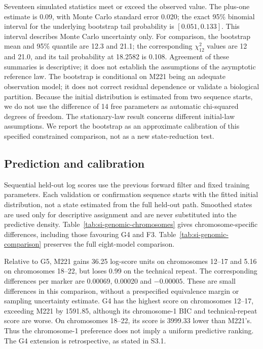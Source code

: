\documentclass[11pt]{article}
\begin{document}
Seventeen simulated statistics meet or exceed the observed value. The
plus-one estimate is 0.09, with Monte Carlo standard error 0.020; the exact
95\% binomial interval for the underlying bootstrap tail probability is
$[0.051,0.133]$. This interval describes Monte Carlo uncertainty only.
For comparison, the bootstrap mean and 95\% quantile are 12.3 and 21.1;
the corresponding $\chi^2_{12}$ values are 12 and 21.0, and its tail
probability at 18.2582 is 0.108. Agreement of these summaries is descriptive;
it does not establish the assumptions of the asymptotic reference law.
The bootstrap is conditional on M221 being an adequate observation model;
it does not correct residual dependence or validate a biological partition.
Because the initial distribution is estimated from two sequence starts,
we do not use the difference of 14 free parameters as automatic chi-squared
degrees of freedom. The stationary-law result concerns different initial-law assumptions. We report the bootstrap as an approximate calibration of this
specified constrained comparison, not as a new state-reduction test.

\subsection{Prediction and calibration}\label{sec:si-genomic-prediction}

Sequential held-out log scores use the previous forward filter and fixed
training parameters. Each validation or confirmation sequence starts with
the fitted initial distribution, not a state estimated from the full held-out
path. Smoothed states are used only for descriptive assignment and are never
substituted into the predictive density. Table~\ref{tab:si-genomic-chromosomes}
gives chromosome-specific differences, including those favouring G4 and F3.
Table~\ref{tab:si-genomic-comparison} preserves the full eight-model comparison.



Relative to G5, M221 gains 36.25 log-score units on chromosomes 12--17
and 5.16 on chromosomes 18--22, but loses 0.99 on the technical repeat.
The corresponding differences per marker are 0.00069, 0.00020 and
$-0.00005$. These are small differences in this comparison, without a
prespecified equivalence margin or sampling uncertainty estimate.
G4 has the highest score on chromosomes 12--17, exceeding M221 by 1591.85,
although its chromosome-1 BIC and technical-repeat score are worse. On
chromosomes 18--22, its score is 3999.33 lower than M221's. Thus the
chromosome-1 preference does not imply a uniform predictive ranking.
The G4 extension is retrospective, as stated in S3.1.
\end{document}
